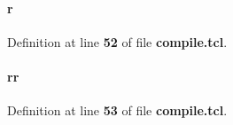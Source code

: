 \paragraph[{r}]{\setlength{\rightskip}{0pt plus 5cm}r}\label{rx__path__top_2bit__pack_2compile_8tcl_a514f1b439f404f86f77090fa9edc96ce}


Definition at line {\bf 52} of file {\bf compile.\+tcl}.

\paragraph[{rr}]{\setlength{\rightskip}{0pt plus 5cm}rr}\label{rx__path__top_2bit__pack_2compile_8tcl_aeb9279982226a42afdf2860dbdc29b45}


Definition at line {\bf 53} of file {\bf compile.\+tcl}.

